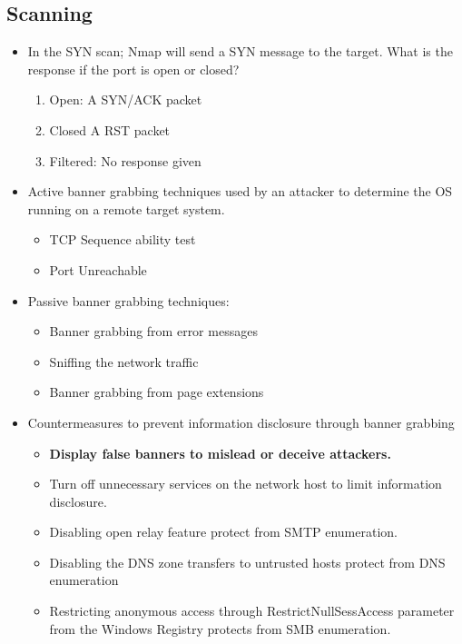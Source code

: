 \subsection{Scanning}
\begin{itemize}
    \item In the SYN scan; Nmap will send a SYN message to the target. What is the response if the port is open or closed?
    \begin{enumerate}
        \item Open: A SYN/ACK packet
        \item Closed A RST packet
        \item Filtered: No response given
    \end{enumerate}
    \item Active banner grabbing techniques used by an attacker to determine the OS running on a remote target system.
    \begin{itemize}
        \item TCP Sequence ability test
        \item Port Unreachable
    \end{itemize}
    \item Passive banner grabbing techniques:
    \begin{itemize}
        \item Banner grabbing from error messages
        \item Sniffing the network traffic
        \item Banner grabbing from page extensions
    \end{itemize}
    \item Countermeasures to prevent information disclosure through banner grabbing
    \begin{itemize}
        \item \textbf{Display false banners to mislead or deceive attackers.}
        \item Turn off unnecessary services on the network host to limit information disclosure.
        \item Disabling open relay feature protect from SMTP enumeration.
        \item Disabling the DNS zone transfers to untrusted hosts protect from DNS enumeration
        \item Restricting anonymous access through RestrictNullSessAccess parameter from the Windows Registry protects from SMB enumeration.
    \end{itemize}
\end{itemize}


